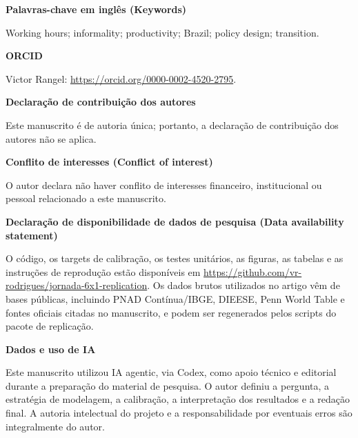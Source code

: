 \documentclass[10pt,twocolumn]{article}
\begin{document}
\textbf{Palavras-chave em ingl\^es (Keywords)}

Working hours; informality; productivity; Brazil; policy design; transition.

\textbf{ORCID}

Victor Rangel: \href{https://orcid.org/0000-0002-4520-2795}{https://orcid.org/0000-0002-4520-2795}.

\textbf{Declara\c{c}\~ao de contribui\c{c}\~ao dos autores}

Este manuscrito \'e de autoria \'unica; portanto, a declara\c{c}\~ao de contribui\c{c}\~ao dos autores n\~ao se aplica.

\textbf{Conflito de interesses (Conflict of interest)}

O autor declara n\~ao haver conflito de interesses financeiro, institucional ou pessoal relacionado a este manuscrito.

\textbf{Declara\c{c}\~ao de disponibilidade de dados de pesquisa (Data availability statement)}

O c\'odigo, os targets de calibra\c{c}\~ao, os testes unit\'arios, as figuras, as tabelas e as instru\c{c}\~oes de reprodu\c{c}\~ao est\~ao dispon\'iveis em \url{https://github.com/vr-rodrigues/jornada-6x1-replication}. Os dados brutos utilizados no artigo v\^em de bases p\'ublicas, incluindo PNAD Cont\'inua/IBGE, DIEESE, Penn World Table e fontes oficiais citadas no manuscrito, e podem ser regenerados pelos scripts do pacote de replica\c{c}\~ao.

\textbf{Dados e uso de IA}

Este manuscrito utilizou IA agentic, via Codex, como apoio t\'ecnico e editorial durante a prepara\c{c}\~ao do material de pesquisa. O autor definiu a pergunta, a estrat\'egia de modelagem, a calibra\c{c}\~ao, a interpreta\c{c}\~ao dos resultados e a reda\c{c}\~ao final. A autoria intelectual do projeto e a responsabilidade por eventuais erros s\~ao integralmente do autor.
\end{document}
